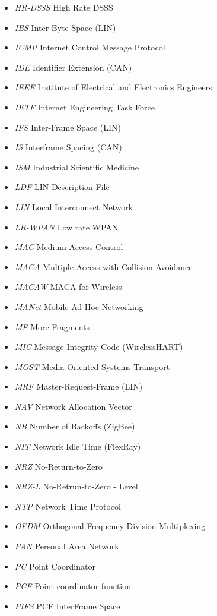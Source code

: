 \documentclass{article}
\begin{document}
\begin{itemize}
	\item \emph{HR-DSSS} High Rate DSSS
	\item \emph{IBS} Inter-Byte Space (LIN)
	\item \emph{ICMP} Internet Control Message Protocol
	\item \emph{IDE} Identifier Extension (CAN)
	\item \emph{IEEE} Institute of Electrical and Electronics Engineers
	\item \emph{IETF} Internet Engineering Task Force
	\item \emph{IFS} Inter-Frame Space (LIN)
	\item \emph{IS} Interframe Spacing (CAN)
	\item \emph{ISM} Industrial Scientific Medicine
	\item \emph{LDF} LIN Description File
	\item \emph{LIN} Local Interconnect Network
	\item \emph{LR-WPAN} Low rate WPAN
	\item \emph{MAC} Medium Access Control
	\item \emph{MACA} Multiple Access with Collision Avoidance
	\item \emph{MACAW} MACA for Wireless
	\item \emph{MANet} Mobile Ad Hoc Networking
	\item \emph{MF} More Fragments
	\item \emph{MIC} Message Integrity Code (WirelessHART)
	\item \emph{MOST} Media Oriented Systems Transport
	\item \emph{MRF} Master-Request-Frame (LIN)
	\item \emph{NAV} Network Allocation Vector
	\item \emph{NB} Number of Backoffs (ZigBee)
	\item \emph{NIT} Network Idle Time (FlexRay)
	\item \emph{NRZ} No-Return-to-Zero
	\item \emph{NRZ-L} No-Retrun-to-Zero - Level
	\item \emph{NTP} Network Time Protocol
	\item \emph{OFDM} Orthogonal Frequency Division Multiplexing
	\item \emph{PAN} Personal Area Network
	\item \emph{PC} Point Coordinator
	\item \emph{PCF} Point coordinator function
	\item \emph{PIFS} PCF InterFrame Space

\end{itemize}
\end{document}
